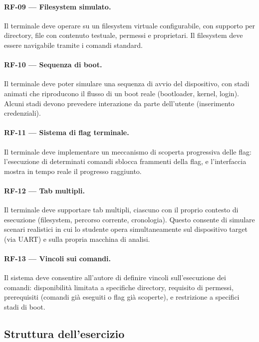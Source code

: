 \paragraph{RF-09 --- Filesystem simulato.} Il terminale deve operare su un filesystem virtuale configurabile, con supporto per directory, file con contenuto testuale, permessi e proprietari. Il filesystem deve essere navigabile tramite i comandi standard.

\paragraph{RF-10 --- Sequenza di boot.} Il terminale deve poter simulare una sequenza di avvio del dispositivo, con stadi animati che riproducono il flusso di un boot reale (bootloader, kernel, login). Alcuni stadi devono prevedere interazione da parte dell'utente (inserimento credenziali).

\paragraph{RF-11 --- Sistema di flag terminale.} Il terminale deve implementare un meccanismo di scoperta progressiva delle flag: l'esecuzione di determinati comandi sblocca frammenti della flag, e l'interfaccia mostra in tempo reale il progresso raggiunto.

\paragraph{RF-12 --- Tab multipli.} Il terminale deve supportare tab multipli, ciascuno con il proprio contesto di esecuzione (filesystem, percorso corrente, cronologia). Questo consente di simulare scenari realistici in cui lo studente opera simultaneamente sul dispositivo target (via UART) e sulla propria macchina di analisi.

\paragraph{RF-13 --- Vincoli sui comandi.} Il sistema deve consentire all'autore di definire vincoli sull'esecuzione dei comandi: disponibilità limitata a specifiche directory, requisito di permessi, prerequisiti (comandi già eseguiti o flag già scoperte), e restrizione a specifici stadi di boot.

\subsection{Struttura dell'esercizio}
\label{subsec:rf-struttura-esercizio}

